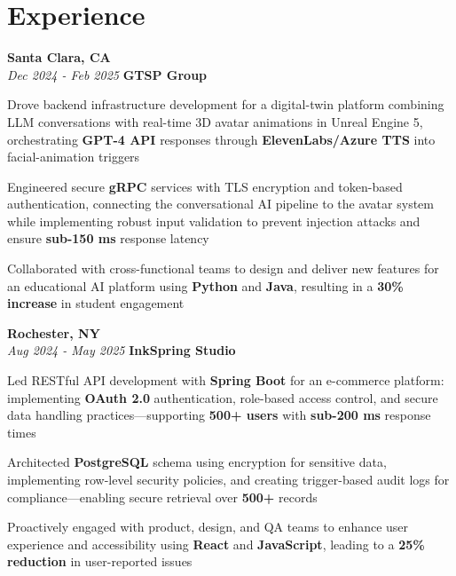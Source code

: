 \section{Experience}

\begin{twocolentry}{
    \textbf{Santa Clara, CA} \\
    \textit{Dec 2024 - Feb 2025}
}{
    \textbf{GTSP Group} \\
}
\end{twocolentry}
\begin{onecolentry}
    \begin{highlights}
        \item Drove backend infrastructure development for a digital-twin platform combining LLM conversations with real-time 3D avatar animations in Unreal Engine 5, orchestrating \textbf{GPT-4 API} responses through \textbf{ElevenLabs/Azure TTS} into facial-animation triggers
        \item Engineered secure \textbf{gRPC} services with TLS encryption and token-based authentication, connecting the conversational AI pipeline to the avatar system while implementing robust input validation to prevent injection attacks and ensure \textbf{sub-150 ms} response latency
        \item Collaborated with cross-functional teams to design and deliver new features for an educational AI platform using \textbf{Python} and \textbf{Java}, resulting in a \textbf{30\% increase} in student engagement
    \end{highlights}
\end{onecolentry}

\vspace{0.2cm}

\begin{twocolentry}{
    \textbf{Rochester, NY} \\
    \textit{Aug 2024 - May 2025}
}{
    \textbf{InkSpring Studio} \\
}
\end{twocolentry}
\begin{onecolentry}
    \begin{highlights}
        \item Led RESTful API development with \textbf{Spring Boot} for an e-commerce platform: implementing \textbf{OAuth 2.0} authentication, role-based access control, and secure data handling practices—supporting \textbf{500+ users} with \textbf{sub-200 ms} response times
        \item Architected \textbf{PostgreSQL} schema using encryption for sensitive data, implementing row-level security policies, and creating trigger-based audit logs for compliance—enabling secure retrieval over \textbf{500+} records
        \item Proactively engaged with product, design, and QA teams to enhance user experience and accessibility using \textbf{React} and \textbf{JavaScript}, leading to a \textbf{25\% reduction} in user-reported issues
    \end{highlights}
\end{onecolentry}

